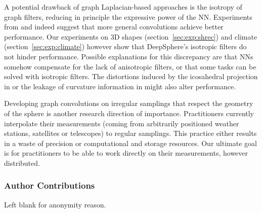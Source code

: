 \documentclass{article} %
\newcommand{\todo}[1]{{\color[rgb]{.6,.1,.6}{#1}}}
\newcommand{\secref}[1]{section~\ref{sec:#1}}
\begin{document}
A potential drawback of graph Laplacian-based approaches is the isotropy of graph filters, reducing in principle the expressive power of the NN.
Experiments from \citet{cohen2019gauge} and \citet{boscaini2016anisotropicgraphnn} indeed suggest that more general convolutions achieve better performance.
Our experiments on 3D shapes (\secref{exp:shrec}) and climate (\secref{exp:climate}) however show that DeepSphere's isotropic filters do not hinder performance.
Possible explanations for this discrepancy are that NNs somehow compensate for the lack of anisotropic filters, or that some tasks can be solved with isotropic filters.
The distortions induced by the icosahedral projection in \citep{cohen2019gauge} or the leakage of curvature information in \citep{boscaini2016anisotropicgraphnn} might also alter performance.

Developing graph convolutions on irregular samplings that respect the geometry of the sphere is another research direction of importance.
Practitioners currently interpolate their measurements (coming from arbitrarily positioned weather stations, satellites or telescopes) to regular samplings.
This practice either results in a waste of precision or computational and storage resources.
Our ultimate goal is for practitioners to be able to work directly on their measurements, however distributed.



\newpage
\subsubsection*{Author Contributions}
Left blank for anonymity reason.
\end{document}
